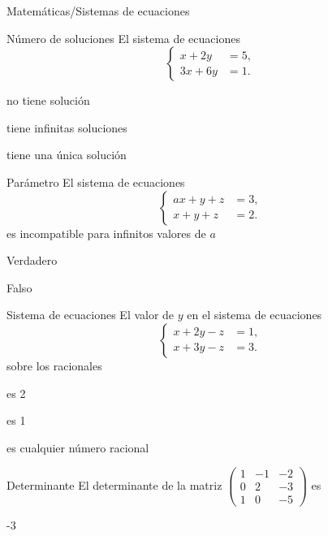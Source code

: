 \documentclass{article}
\begin{document}
\begin{quiz}{Matemáticas/Sistemas de ecuaciones}

	\begin{multi}[feedback={El rango de la matriz de coeficientes es uno, mientras que el de la matriz ampliada es dos. Por tanto, no hay solución. Otra forma de ver que es incompatible es restando a la segunda ecuación menos tres veces la primera, lo que da $0=-14$.}]{Número de soluciones}
			El sistema de ecuaciones 
			\[
			\left\lbrace
			\begin{array}{rl}
				x+2y  &=5,\\
				3x+6y &=1.
			\end{array}\right.
			\]
			\item* no tiene solución
			\item tiene infinitas soluciones
			\item tiene una única solución
	\end{multi}

	\begin{multi}[feedback={Para $a\neq 1$ la matriz de coeficientes tiene rango dos, y por tanto el sistema es compatible (indeterminado). El único valor para el que es incompatible es para $a=1$.}]{Parámetro}
		El sistema de ecuaciones 
			\[
			\left\lbrace
			\begin{array}{rl}
				a x+ y + z  &=3,\\
				x+ y + z &=2.
			\end{array}\right.
			\]		
		es incompatible para infinitos valores de $a$
		\item Verdadero
		\item* Falso
	\end{multi}

	\begin{multi}[feedback={Si restamos a la segunda ecuación la primera, obtenemos $y=2$.}]{Sistema de ecuaciones}
		El valor de $y$ en el sistema de ecuaciones 
					\[
		\left\lbrace
		\begin{array}{rl}
			x+ 2y - z  &=1,\\
			x+ 3y - z &=3.
		\end{array}\right.
		\]
		sobre los racionales
		\item* es 2
		\item es 1
		\item es cualquier número racional 
	\end{multi}

	\begin{numerical}{Determinante}
		El determinante de la matriz $\left(\begin{array}{rrr} 1 & -1 & -2\\0 & 2 & -3\\1 & 0 & -5\end{array}\right)$ es 
		\item -3
	\end{numerical}


\end{quiz}
\end{document}
